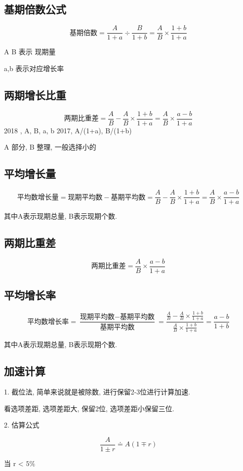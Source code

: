 \subsection{基期倍数公式}

$$
	基期倍数 = \frac{A}{1+a} \div \frac{B}{1+b} = \frac{A}{B} \times \frac{1+b}{1+a}
$$

A B 表示 现期量

a,b 表示对应增长率

\subsection{两期增长比重}

$$
	\mbox{两期比重差} = \frac{A}{B} - \frac{A}{B} \times \frac{1+b}{1+a} =
	\frac{A}{B} \times \frac{a-b}{1+a}
$$
2018  , A, B, a, b
2017, A/(1+a), B/(1+b)

A 部分, B 整理, 一般选择小的


\subsection{平均增长量}

$$
	\mbox{平均数增长量} = \mbox{现期平均数} - \mbox{基期平均数} = \frac{A}{B} - \frac{A}{B} \times \frac{1+b}{1+a} =
	\frac{A}{B} \times \frac{a-b}{1+a}
$$

其中A表示现期总量, B表示现期个数.

\subsection{两期比重差}
$$
	\mbox{两期比重差} = \frac{A}{B} \times \frac{a - b}{1+a}
$$

\subsection{平均增长率}

$$
	\mbox{平均数增长率} = \frac{\mbox{现期平均数} - \mbox{基期平均数}}{\mbox{基期平均数}} =
	\frac{\frac{A}{B}-\frac{A}{B} \times \frac{1+b}{1+a}}{\frac{A}{B} \times \frac{1+b}{1+a}} = \frac{a-b}{1+b}
$$

其中A表示现期总量, B表示现期个数.

\subsection{加速计算}
1. 截位法, 简单来说就是被除数, 进行保留2-3位进行计算加速.

看选项差距, 选项差距大, 保留2位, 选项差距小保留三位.

2. 估算公式

$$
	\frac{A}{1\pm r} \doteq A(1 \mp r)
$$

当 r < $5\%$

